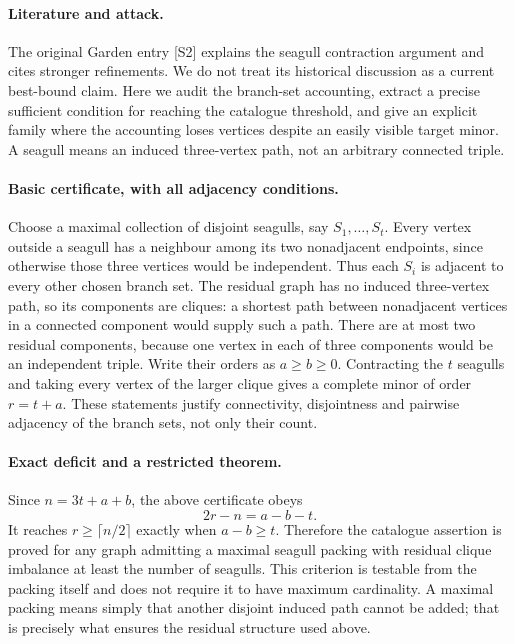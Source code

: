 \documentclass[11pt,a4paper]{article}
\begin{document}
\paragraph{Literature and attack.}
The original Garden entry [S2] explains the seagull contraction argument and cites stronger refinements. We do not treat its historical discussion as a current best-bound claim. Here we audit the branch-set accounting, extract a precise sufficient condition for reaching the catalogue threshold, and give an explicit family where the accounting loses vertices despite an easily visible target minor. A seagull means an induced three-vertex path, not an arbitrary connected triple.

\paragraph{Basic certificate, with all adjacency conditions.}
Choose a maximal collection of disjoint seagulls, say $S_1,\ldots,S_t$. Every vertex outside a seagull has a neighbour among its two nonadjacent endpoints, since otherwise those three vertices would be independent. Thus each $S_i$ is adjacent to every other chosen branch set. The residual graph has no induced three-vertex path, so its components are cliques: a shortest path between nonadjacent vertices in a connected component would supply such a path. There are at most two residual components, because one vertex in each of three components would be an independent triple. Write their orders as $a\ge b\ge0$. Contracting the $t$ seagulls and taking every vertex of the larger clique gives a complete minor of order $r=t+a$. These statements justify connectivity, disjointness and pairwise adjacency of the branch sets, not only their count.

\paragraph{Exact deficit and a restricted theorem.}
Since $n=3t+a+b$, the above certificate obeys
\[
 2r-n=a-b-t. \tag{1}
\]
It reaches $r\ge\lceil n/2\rceil$ exactly when $a-b\ge t$. Therefore the catalogue assertion is proved for any graph admitting a maximal seagull packing with residual clique imbalance at least the number of seagulls. This criterion is testable from the packing itself and does not require it to have maximum cardinality. A maximal packing means simply that another disjoint induced path cannot be added; that is precisely what ensures the residual structure used above.
\end{document}
